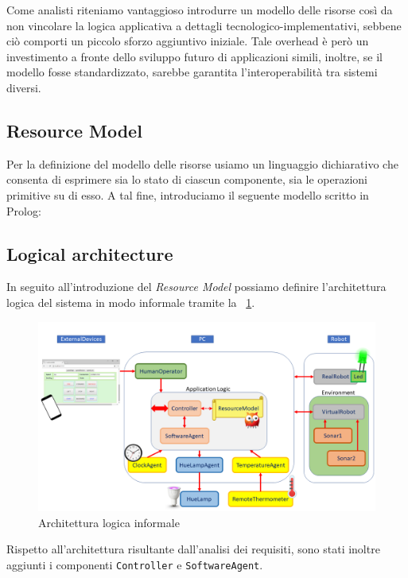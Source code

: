 \documentclass{../llncs}
\newcommand{\labelfig}[1]{\label{fig:#1}}
\newcommand{\xf}[1]{\figurename~\ref{fig:#1}}
\begin{document}
Come analisti riteniamo vantaggioso introdurre un modello delle risorse così da non vincolare la logica applicativa a dettagli tecnologico-implementativi, sebbene ciò comporti un piccolo sforzo aggiuntivo iniziale. Tale overhead è però un investimento a fronte dello sviluppo futuro di applicazioni simili, inoltre, se il modello fosse standardizzato, sarebbe garantita l'interoperabilità tra sistemi diversi.

\subsection{Resource Model}
Per la definizione del modello delle risorse usiamo un linguaggio dichiarativo che consenta di esprimere sia lo stato di ciascun componente, sia le operazioni primitive su di esso. A tal fine, introduciamo il seguente modello scritto in Prolog:\\



\subsection{Logical architecture}
In seguito all'introduzione del \emph{Resource Model} possiamo definire l'architettura logica del sistema in modo informale tramite la \xf{informalLA}.

\begin{figure}[!htb]
\centering
\includegraphics[scale=0.4]{img/informalArchitecture2.png}
\caption{Architettura logica informale}\labelfig{informalLA}
\end{figure}

Rispetto all'architettura risultante dall'analisi dei requisiti, sono stati inoltre aggiunti i componenti \texttt{Controller} e \texttt{SoftwareAgent}.
\end{document}
